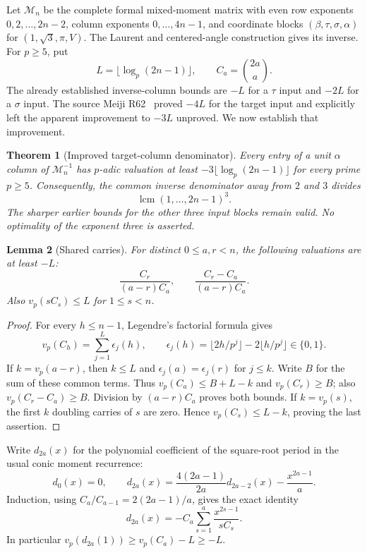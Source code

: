 \documentclass[11pt,a4paper]{article}
\numberwithin{equation}{section}
\newtheorem{theorem}{Theorem}[section]
\newtheorem{lemma}[theorem]{Lemma}
\theoremstyle{definition}\newtheorem{definition}[theorem]{Definition}
\theoremstyle{remark}\newtheorem{remark}[theorem]{Remark}
\begin{document}
Let $\mathcal M_n$ be the complete formal mixed-moment matrix with even
row exponents $0,2,\ldots,2n-2$, column exponents $0,\ldots,4n-1$, and
coordinate blocks $(\beta,\tau,\sigma,\alpha)$ for
$(1,\sqrt3,\pi,V)$. The Laurent and centered-angle construction gives
its inverse. For $p\ge5$, put
\[
 L=\lfloor\log_p(2n-1)\rfloor,\qquad C_a=\binom{2a}{a}.
\]
The already established inverse-column bounds are $-L$ for a
$\tau$ input and $-2L$ for a $\sigma$ input. The source Meiji R62~\cite{M62}
proved $-4L$ for the target input and explicitly left the apparent
improvement to $-3L$ unproved. We now establish that improvement.

\begin{theorem}[Improved target-column denominator]\label{inv3:thm:inverse-three}
Every entry of a unit $\alpha$ column of $\mathcal M_n^{-1}$ has
$p$-adic valuation at least $-3\lfloor\log_p(2n-1)\rfloor$
for every prime $p\ge5$. Consequently, the common inverse denominator
away from $2$ and $3$ divides
\[
 \operatorname{lcm}(1,\ldots,2n-1)^3.
\]
The sharper earlier bounds for the other three input blocks remain
valid. No optimality of the exponent three is asserted.
\end{theorem}

\begin{lemma}[Shared carries]\label{inv3:lem:shared-carries}
For distinct $0\le a,r<n$, the following valuations are at least $-L$:
\[
 \frac{C_r}{(a-r)C_a},\qquad
 \frac{C_r-C_a}{(a-r)C_a}.
\]
Also $v_p(sC_s)\le L$ for $1\le s<n$.
\end{lemma}
\begin{proof}
For every $h\le n-1$, Legendre's factorial formula gives
\[
 v_p(C_h)=\sum_{j=1}^{L}\epsilon_j(h),\qquad
 \epsilon_j(h)=\lfloor2h/p^j\rfloor-2\lfloor h/p^j\rfloor
              \in\{0,1\}.
\]
If $k=v_p(a-r)$, then $k\le L$ and
$\epsilon_j(a)=\epsilon_j(r)$ for $j\le k$.
Write $B$ for the sum of these common terms. Thus
$v_p(C_a)\le B+L-k$ and $v_p(C_r)\ge B$; also
$v_p(C_r-C_a)\ge B$. Division by $(a-r)C_a$ proves both bounds.
If $k=v_p(s)$, the first $k$ doubling carries of $s$ are zero.
Hence $v_p(C_s)\le L-k$, proving the last assertion.
\end{proof}

Write $d_{2a}(x)$ for the polynomial coefficient of the square-root
period in the usual conic moment recurrence:
\[
 d_0(x)=0,\qquad
 d_{2a}(x)=\frac{4(2a-1)}{2a}d_{2a-2}(x)-\frac{x^{2a-1}}a.
\]
Induction, using $C_a/C_{a-1}=2(2a-1)/a$, gives the exact identity
\begin{equation}\label{inv3:eq:d-sum}
 d_{2a}(x)=-C_a\sum_{s=1}^a\frac{x^{2s-1}}{sC_s}.
\end{equation}
In particular $v_p(d_{2a}(1))\ge v_p(C_a)-L\ge-L$.
\end{document}
